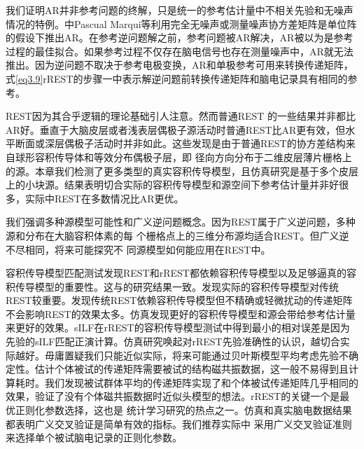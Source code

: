 我们证明AR并非参考问题的终解，只是统一的参考估计量中不相关先验和无噪声情况的特例。\cite{pascual-marqui_assessing_2011}中Pascual Marqui等利用完全无噪声或测量噪声协方差矩阵是单位阵的假设下推出AR。在参考逆问题解之前，参考问题被AR解决，AR被以为是参考过程的最佳拟合。如果参考过程不仅存在脑电信号也存在测量噪声中，AR就无法推出。因为逆问题不取决于参考电极变换，AR和单极参考可用来转换传递矩阵，式\eqref{eq3.9}rREST的步骤一中表示解逆问题前转换传递矩阵和脑电记录具有相同的参考。

REST因为其合乎逻辑的理论基础引人注意。然而普通REST
的一些结果并非都比AR好。垂直于大脑皮层或者浅表层偶极子源活动时普通REST比AR更有效，但水平断面或深层偶极子活动时并非如此。这些发现是由于普通REST的协方差结构来自球形容积传导体和等效分布偶极子层，即
径向方向分布于二维皮层薄片栅格上的源。本章我们检测了更多类型的真实容积传导模型，且仿真研究是基于多个皮层上的小块源。结果表明切合实际的容积传导模型和源空间下参考估计量并非好很多，实际中REST在多数情况比AR更优。

我们强调多种源模型可能性和广义逆问题概念。因为REST属于广义逆问题，多种源和分布在大脑容积体素的每
个栅格点上的三维分布源均适合REST。但广义逆不尽相同，将来可能探究不
同源模型如何能应用在REST中。

容积传导模型匹配测试发现REST和rREST都依赖容积传导模型以及足够逼真的容积传导模型的重要性。这与的研究结果一致。\cite{liu_q_estimating_2015}发现实际的容积传导模型对传统REST较重要。\cite{hu_how_2018}发现传统REST依赖容积传导模型但不精确或轻微扰动的传递矩阵不会影响REST的效果太多。仿真发现更好的容积传导模型和源会带给参考估计量来更好的效果。sILF在rREST的容积传导模型测试中得到最小的相对误差是因为先验的sILF匹配正演计算。仿真研究唤起对rREST先验准确性的认识，越切合实际越好。毋庸置疑我们只能近似实际，将来可能通过贝叶斯模型平均考虑先验不确定性。估计个体被试的传递矩阵需要被试的结构磁共振数据，这一般不易得到且计算耗时。我们发现被试群体平均的传递矩阵实现了和个体被试传递矩阵几乎相同的效果，验证了没有个体磁共振数据时近似头模型的想法。rREST的关键一个是最优正则化参数选择，这也是
统计学习研究的热点之一。仿真和真实脑电数据结果都表明广义交叉验证是简单有效的指标。我们推荐实际中
采用广义交叉验证准则来选择单个被试脑电记录的正则化参数。

